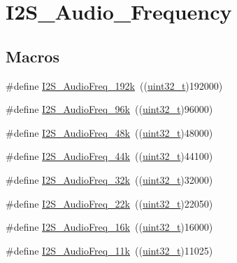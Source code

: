 \hypertarget{group___i2_s___audio___frequency}{}\section{I2\+S\+\_\+\+Audio\+\_\+\+Frequency}
\label{group___i2_s___audio___frequency}
\subsection*{Macros}
\begin{DoxyCompactItemize}
\item 
\#define \hyperlink{group___i2_s___audio___frequency_gadfdaed9a2acb71f2cdd737be81a6f747}{I2\+S\+\_\+\+Audio\+Freq\+\_\+192k}~((\hyperlink{_p_e___types_8h_a33594304e786b158f3fb30289278f5af}{uint32\+\_\+t})192000)
\item 
\#define \hyperlink{group___i2_s___audio___frequency_ga5acd02a974e90bb8f2c4e07f8fa0231b}{I2\+S\+\_\+\+Audio\+Freq\+\_\+96k}~((\hyperlink{_p_e___types_8h_a33594304e786b158f3fb30289278f5af}{uint32\+\_\+t})96000)
\item 
\#define \hyperlink{group___i2_s___audio___frequency_gac5f3f0416f9dd03d680d0fcee93b50ab}{I2\+S\+\_\+\+Audio\+Freq\+\_\+48k}~((\hyperlink{_p_e___types_8h_a33594304e786b158f3fb30289278f5af}{uint32\+\_\+t})48000)
\item 
\#define \hyperlink{group___i2_s___audio___frequency_ga3514e4c292b92b8a7d8a6916f4e3690c}{I2\+S\+\_\+\+Audio\+Freq\+\_\+44k}~((\hyperlink{_p_e___types_8h_a33594304e786b158f3fb30289278f5af}{uint32\+\_\+t})44100)
\item 
\#define \hyperlink{group___i2_s___audio___frequency_gac501b566718f4890aaafa323a33b732c}{I2\+S\+\_\+\+Audio\+Freq\+\_\+32k}~((\hyperlink{_p_e___types_8h_a33594304e786b158f3fb30289278f5af}{uint32\+\_\+t})32000)
\item 
\#define \hyperlink{group___i2_s___audio___frequency_gac6adafe5586e83c2408f1eab8edb4ab3}{I2\+S\+\_\+\+Audio\+Freq\+\_\+22k}~((\hyperlink{_p_e___types_8h_a33594304e786b158f3fb30289278f5af}{uint32\+\_\+t})22050)
\item 
\#define \hyperlink{group___i2_s___audio___frequency_ga5b8f2f8393e022becf0dbb04d1b01950}{I2\+S\+\_\+\+Audio\+Freq\+\_\+16k}~((\hyperlink{_p_e___types_8h_a33594304e786b158f3fb30289278f5af}{uint32\+\_\+t})16000)
\item 
\#define \hyperlink{group___i2_s___audio___frequency_ga3adf95fadd1ad75670ed1babd5faca39}{I2\+S\+\_\+\+Audio\+Freq\+\_\+11k}~((\hyperlink{_p_e___types_8h_a33594304e786b158f3fb30289278f5af}{uint32\+\_\+t})11025)

\end{DoxyCompactItemize}
